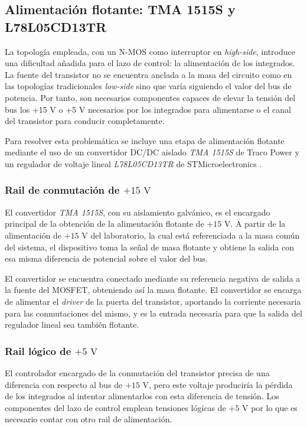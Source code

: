 \documentclass[12pt]{report} %
\begin{document}
\subsection{Alimentación flotante: TMA 1515S y L78L05CD13TR}
La topología empleada, con un N-MOS como interruptor en \textit{high-side}, introduce una dificultad añadida para el lazo de control: la alimentación de los integrados. La fuente del transistor no se encuentra anclada a la masa del circuito como en las topologías tradicionales \textit{low-side} sino que varía siguiendo el valor del bus de potencia. Por tanto, son necesarios componentes capaces de elevar la tensión del bus los +15 V o +5 V necesarios por los integrados para alimentarse o el canal del transistor para conducir completamente. 

Para resolver esta problemática se incluye una etapa de alimentación flotante mediante el uso de un convertidor DC/DC aislado \textit{TMA 1515S} de Traco Power \cite{traco_power_tma_nodate} y un regulador de voltaje lineal \textit{L78L05CD13TR} de STMicroelectronics \cite{stmicroelectronics_l78l05cd13tr_nodate}.

\subsubsection{Rail de conmutación de $+15\text{ V}$}

El convertidor \textit{TMA 1515S}, con su aislamiento galvánico, es el encargado principal de la obtención de la alimentación flotante de $+15\text{ V}$. A partir de la alimentación de $+15\text{ V}$ del laboratorio, la cual está referenciada a la masa común del sistema, el dispositivo toma la señal de masa flotante y obtiene la salida con esa misma diferencia de potencial sobre el valor del bus.

El convertidor se encuentra conectado mediante su referencia negativa de salida a la fuente del MOSFET, obteniendo así la masa flotante. El convertidor se encarga de alimentar el \textit{driver} de la puerta del transistor, aportando la corriente necesaria para las conmutaciones del mismo, y es la entrada necesaria para que la salida del regulador lineal sea también flotante. 

\subsubsection{Rail lógico de $+5\text{ V}$}

El controlador encargado de la conmutación del transistor precisa de una diferencia con respecto al bus de $+15\text{ V}$, pero este voltaje produciría la pérdida de los integrados al intentar alimentarlos con esta diferencia de tensión. Los componentes del lazo de control emplean tensiones lógicas de $+5\text{ V}$ por lo que es necesario contar con otro rail de alimentación.
\end{document}
